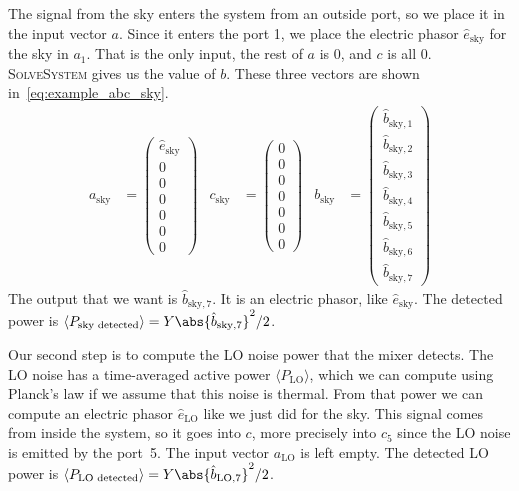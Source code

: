 The signal from the sky enters the system from an outside port, so we place it in the input vector $a$.
Since it enters the port 1, we place the electric phasor $\hat{e}_\text{sky}$ for the sky in $a_1$.
That is the only input, the rest of $a$ is 0, and $c$ is all 0.
\textsc{SolveSystem} gives us the value of $b$.
These three vectors are shown in~\cref{eq:example_abc_sky}.
\begin{align}
    a_\text{sky}
    &=
    \begin{pmatrix}
        \hat{e}_\text{sky} \\ 0 \\ 0 \\ 0 \\ 0 \\ 0 \\ 0
    \end{pmatrix}
    &
    c_\text{sky}
    &=
    \begin{pmatrix}
        0 \\ 0 \\ 0 \\ 0 \\ 0 \\ 0 \\ 0
    \end{pmatrix}
    &
    b_\text{sky}
    &=
    \begin{pmatrix}
        \hat{b}_{\text{sky},1}\\
        \hat{b}_{\text{sky},2}\\
        \hat{b}_{\text{sky},3}\\
        \hat{b}_{\text{sky},4}\\
        \hat{b}_{\text{sky},5}\\
        \hat{b}_{\text{sky},6}\\
        \hat{b}_{\text{sky},7}
    \end{pmatrix}
    \label{eq:example_abc_sky}
\end{align}
The output that we want is $\hat{b}_{\text{sky},7}$.
It is an electric phasor, like $\hat{e}_\text{sky}$.
The detected power is
$\langle P_\text{sky detected} \rangle = Y\abs{\hat{b}_{\text{sky},7}}^2 / 2$.

Our second step is to compute the LO noise power that the mixer detects.
The LO noise has a time-averaged active power $\langle P_\text{LO} \rangle$, which we can compute using Planck's law if we assume that this noise is thermal.
From that power we can compute an electric phasor $\hat{e}_\text{LO}$ like we just did for the sky.
This signal comes from inside the system, so it goes into $c$, more precisely into $c_5$ since the LO noise is emitted by the port~5.
The input vector $a_\text{LO}$ is left empty.
The detected LO power is
$\langle P_\text{LO detected} \rangle = Y\abs{\hat{b}_{\text{LO},7}}^2 / 2$.

